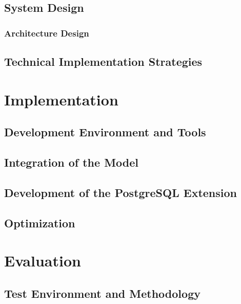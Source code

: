 \documentclass{article}
\begin{document}
\subsection{System Design}

\subsubsection{Architecture Design}

\subsection{Technical Implementation Strategies}

\newpage

\section{Implementation}

\subsection{Development Environment and Tools}

\subsection{Integration of the Model}


\subsection{Development of the PostgreSQL Extension}


\subsection{Optimization}

\newpage

\section{Evaluation}


\subsection{Test Environment and Methodology}
\end{document}
